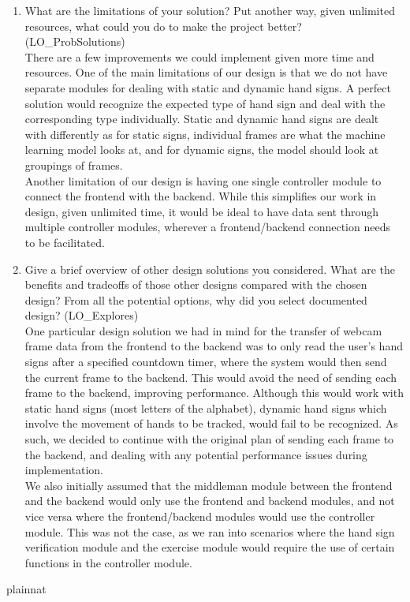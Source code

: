 \documentclass[12pt, titlepage]{article}
\begin{document}
\begin{enumerate}
  \item What are the limitations of your solution?  Put another way, given
  unlimited resources, what could you do to make the project better? (LO\_ProbSolutions)\\
  There are a few improvements we could implement given more time and resources. One of the main limitations of our design is that we
  do not have separate modules for dealing with static and dynamic hand signs. A perfect solution would recognize the expected type of
  hand sign and deal with the corresponding type individually. Static and dynamic hand signs are dealt with differently as for static signs,
  individual frames are what the machine learning model looks at, and for dynamic signs, the model should look at groupings of frames.\\
  Another limitation of our design is having one single controller module to connect the frontend with the backend. While this simplifies our
  work in design, given unlimited time, it would be ideal to have data sent through multiple controller modules, wherever a frontend/backend
  connection needs to be facilitated.
  \item Give a brief overview of other design solutions you considered.  What
  are the benefits and tradeoffs of those other designs compared with the chosen
  design?  From all the potential options, why did you select documented design?
  (LO\_Explores)\\
  One particular design solution we had in mind for the transfer of webcam frame data from the frontend to the backend was to
  only read the user's hand signs after a specified countdown timer, where the system would then send the current frame to the
  backend. This would avoid the need of sending each frame to the backend, improving performance. Although this would work with
  static hand signs (most letters of the alphabet), dynamic hand signs which involve the movement of hands to be tracked, would fail
  to be recognized. As such, we decided to continue with the original plan of sending each frame to the backend, and dealing with
  any potential performance issues during implementation.\\
  We also initially assumed that the middleman module between the frontend and the backend would only use the frontend and backend modules,
  and not vice versa where the frontend/backend modules would use the controller module. This was not the case, as we ran into
  scenarios where the hand sign verification module and the exercise module would require the use of certain functions in the controller
  module.
\end{enumerate}

 {plainnat}


\newpage{}
\end{document}
